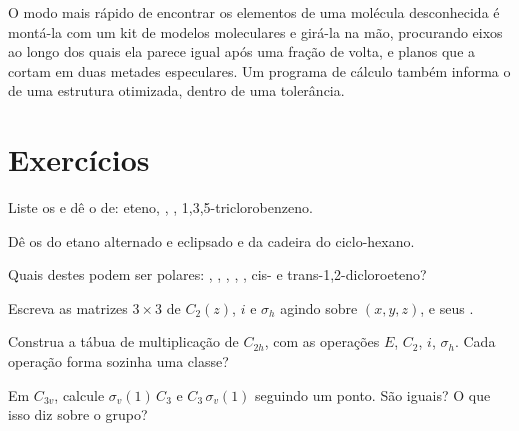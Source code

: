 \begin{inthelab}
O modo mais rápido de encontrar os elementos de uma molécula desconhecida é
montá-la com um kit de modelos moleculares e girá-la na mão, procurando eixos
ao longo dos quais ela parece igual após uma fração de volta, e planos que a
cortam em duas metades especulares. Um programa de cálculo também informa o
 de uma estrutura otimizada, dentro de uma tolerância.
\end{inthelab}

\section{Exercícios}

\begin{exercise}[$\star$]\label{exo:b3:point-groups:1}
Liste os  e dê o  de: eteno, ,
, 1,3,5-triclorobenzeno.
\end{exercise}

\begin{exercise}[$\star$]\label{exo:b3:point-groups:2}
Dê os  do etano alternado e eclipsado e da cadeira do
ciclo-hexano.
\end{exercise}

\begin{exercise}[$\star$]\label{exo:b3:point-groups:3}
Quais destes podem ser polares: , , , , ,
cis- e trans-1,2-dicloroeteno?
\end{exercise}

\begin{exercise}[$\star$]\label{exo:b3:point-groups:4}
Escreva as matrizes $3\times3$ de $C_2(z)$, $i$ e $\sigma_h$ agindo sobre $(x, y, z)$,
e seus .
\end{exercise}

\begin{exercise}[$\star\star$]\label{exo:b3:point-groups:5}
Construa a tábua de multiplicação de $C_{2h}$, com as operações $E$, $C_2$, $i$,
$\sigma_h$. Cada operação forma sozinha uma classe?
\end{exercise}

\begin{exercise}[$\star\star$]\label{exo:b3:point-groups:6}
Em $C_{3v}$, calcule $\sigma_v(1)\,C_3$ e $C_3\,\sigma_v(1)$ seguindo um ponto.
São iguais? O que isso diz sobre o grupo?
\end{exercise}

